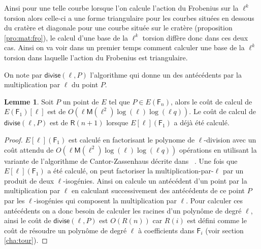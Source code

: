 \documentclass[10pt,a4paper]{book}
\theoremstyle{plain}
\theoremstyle{definition}
\newtheorem{lem}[thm]{Lemme}
\theoremstyle{definition}
\theoremstyle{definition}
\theoremstyle{definition}
\theoremstyle{remark}
\theoremstyle{remark}
\theoremstyle{definition}
\begin{document}
Ainsi pour une telle courbe lorsque l'on calcule l'action du Frobenius sur la $\ell^k$ torsion alors celle-ci a une forme triangulaire pour les courbes situées en dessous du cratère et diagonale pour une courbe située sur le cratère (proposition \ref{pro:mat:fro}), le calcul d'une base de la $\ell^k$ torsion diffère donc dans ces deux cas. Ainsi on va voir dans un premier temps comment calculer une base de la $\ell^k$ torsion dans laquelle l'action du Frobenius est triangulaire.

On note par $\mathsf{divise}(\ell,P)$ l'algorithme qui donne un des antécédents par la multiplication par $\ell$ du point $P$.

\begin{lem}
\label{lem:div:cou}
Soit $P$ un point de $E$ tel que $P \in E(\mathsf{F}_{n})$, alors le coût de calcul de $E(\mathsf{F}_1)[\ell]$ est de $O(\ell \mathsf{M}(\ell^2)\log(\ell)\log(\ell q))$. Le coût de calcul de $\mathsf{divise}(\ell,P)$ est de $\mathsf{R}(n+1)$ lorsque $E[\ell](\mathsf{F}_1)$ a déjà été calculé.
\end{lem}

\begin{proof}
$E[\ell](\mathsf{F}_1)$ est calculé en factorisant le polynome de 
$\ell$-division 
avec un coût attendu de $O(\ell \mathsf{M}(\ell^2)\log(\ell)\log(\ell q))$
opérations en utilisant la variante de l'algorithme de Cantor-Zassenhaus 
décrite dans ~\cite[Chapter~14.5]{vzGJG03}.
  Une fois que $E[\ell](\mathsf{F}_1)$ a été calculé, on peut factoriser la
  multiplication-par-$\ell$ par un produit de deux $\ell$-isogénies. Ainsi on
   calcule un antécédent d'un point par la multiplication par $\ell$ en 
   calculant successivement des antécédents de ce point $P$ par les 
   $\ell$-isogénies  qui composent la multiplication par $\ell$. Pour calculer 
   ces antécédents on a donc besoin de calculer les racines d'un polynôme de 
   degré $\ell$, ainsi le coût de $\mathsf{divise}(\ell,P)$ est $O(R(n))$ car 
   $R(i)$ est défini comme le coût de résoudre un polynôme de degré $\ell$ à 
   coefficients dans $\mathsf{F}_i$ (voir section \ref{cha:tour}).  
\end{proof}
\end{document}
